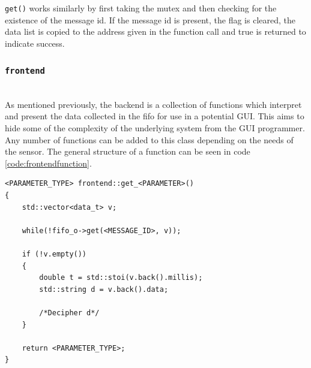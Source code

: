 \texttt{get()} works similarly by first taking the mutex and then checking for the existence of the message id.
If the message id is present, the flag is cleared, the data list is copied to the address given in the function call and true is returned to indicate success.

\subsubsection{\texttt{frontend}}~\\
As mentioned previously, the backend is a collection of functions which interpret and present the data collected in the fifo for use in a potential GUI.
This aims to hide some of the complexity of the underlying system from the GUI programmer.
Any number of functions can be added to this class depending on the needs of the sensor.
The general structure of a function can be seen in code \ref{code:frontendfunction}.

\begin{lstlisting}[caption=Function template for accesing data in fifo,label=code:frontendfunction]
<PARAMETER_TYPE> frontend::get_<PARAMETER>()
{
	std::vector<data_t> v;

	while(!fifo_o->get(<MESSAGE_ID>, v));

	if (!v.empty())
	{
		double t = std::stoi(v.back().millis);
		std::string d = v.back().data;

		/*Decipher d*/
	}

	return <PARAMETER_TYPE>;
}
\end{lstlisting}